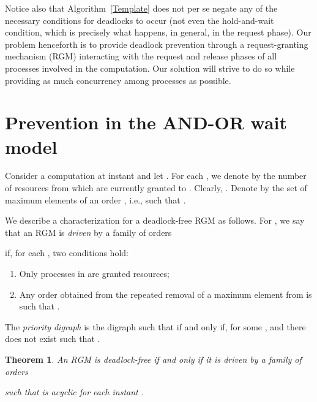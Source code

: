 \documentclass{article}
\newtheorem{thm}[lem]{Theorem}
\begin{document}
Notice also that Algorithm~\ref{Template} does not per se negate any of the
necessary conditions for deadlocks to occur (not even the hold-and-wait
condition, which is precisely what happens, in general, in the request phase).
Our problem henceforth is to provide deadlock prevention through a
request-granting mechanism (RGM) interacting with the request and release phases
of all processes involved in the computation. Our solution will strive to do so
while providing as much concurrency among processes as possible.

\section{Prevention in the AND-OR wait model}

Consider a computation at instant  and let .
For each , we denote by  the number of resources from
 which are currently granted to . Clearly,
. Denote by  the set of
maximum elements of an order , i.e.,
  such that
 .

We describe a characterization for a deadlock-free RGM as follows. For
, we say that an
RGM is \emph{driven} by a family of orders
  
if, for each , two conditions hold: 

\begin{enumerate}
\item Only processes in  are granted resources; 
\item Any order  obtained from the repeated removal of a maximum element
from  is such that
.
\end{enumerate}

The \emph{priority digraph}  is the digraph
 such that  if and only if, for some
,  and there does not exist
 such that .

\begin{thm}
\label{CaracLivreDeadlock:Teorico}
An RGM is deadlock-free if and only if it is driven by a family of orders

such that  is acyclic for each instant .
\end{thm}
\end{document}
